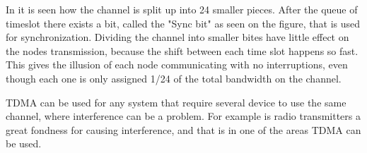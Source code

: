 In  it is seen how the channel is split up into 24 smaller pieces. 
After the queue of timeslot there exists a bit, called the "Sync bit" as seen on the figure, that is used for synchronization.
Dividing the channel into smaller bites have little effect on the nodes transmission, because the shift between each time slot happens so fast.
This gives the illusion of each node communicating with no interruptions, even though each one is only assigned 1/24 of the total bandwidth on the channel.

TDMA can be used for any system that require several device to use the same channel, where interference can be a problem.
For example is radio transmitters a great fondness for causing interference, and that is in one of the areas TDMA can be used.\cite{interferance_protocols}






